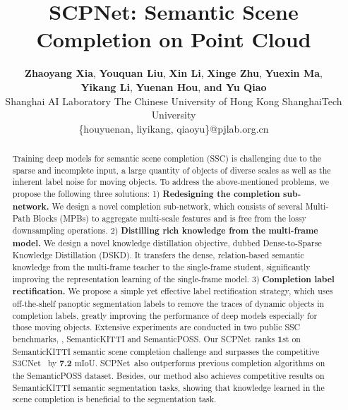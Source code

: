 \documentclass[10pt,twocolumn,letterpaper]{article}
\begin{document}
\title{SCPNet: Semantic Scene Completion on Point Cloud}

\author{\textbf{Zhaoyang Xia}, \textbf{Youquan Liu}, \textbf{Xin Li}, \textbf{Xinge Zhu}, \textbf{Yuexin Ma},\\ 
\textbf{Yikang Li}, \textbf{Yuenan Hou}, \textbf{and Yu Qiao}\\
Shanghai AI Laboratory The Chinese University of Hong Kong ShanghaiTech University\\
\{houyuenan, liyikang, qiaoyu\}@pjlab.org.cn
}


\maketitle

\def\algorithmname{SCPNet}

\begin{abstract}


Training deep models for semantic scene completion (SSC) is challenging due to the sparse and incomplete input, a large quantity of objects of diverse scales as well as the inherent label noise for moving objects. To address the above-mentioned problems, we propose the following three solutions: 1) \textbf{Redesigning the completion sub-network.} We design a novel completion sub-network, which consists of several Multi-Path Blocks (MPBs) to aggregate multi-scale features and is free from the lossy downsampling operations. 2) \textbf{Distilling rich knowledge from the multi-frame model.} We design a novel knowledge distillation objective, dubbed Dense-to-Sparse Knowledge Distillation (DSKD). It transfers the dense, relation-based semantic knowledge from the multi-frame teacher to the single-frame student, significantly improving the representation learning of the single-frame model. 3) \textbf{Completion label rectification.} We propose a simple yet effective label rectification strategy, which uses off-the-shelf panoptic segmentation labels to remove the traces of dynamic objects in completion labels, greatly improving the performance of deep models especially for those moving objects. Extensive experiments are conducted in two public SSC benchmarks, \ie, SemanticKITTI and SemanticPOSS. Our \algorithmname~ranks \textbf{1}st on SemanticKITTI semantic scene completion challenge and surpasses the competitive S3CNet~\cite{s3cnet} by \textbf{7.2} mIoU. \algorithmname~also outperforms previous completion algorithms on the SemanticPOSS dataset. Besides, our method also achieves competitive results on SemanticKITTI semantic segmentation tasks, showing that knowledge learned in the scene completion is beneficial to the segmentation task. %
 \end{abstract}
\end{document}
